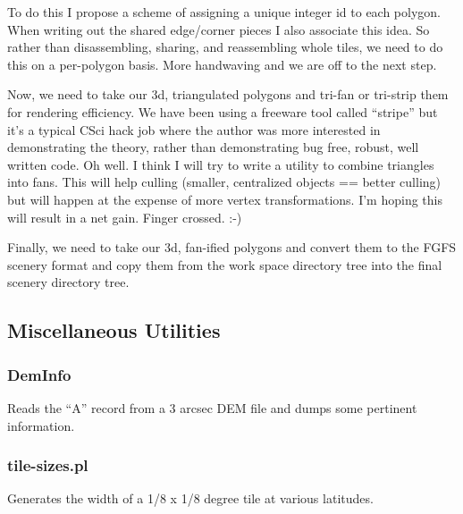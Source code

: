 \documentclass[12pt]{article}
\begin{document}
To do this I propose a scheme of assigning a unique integer id to each
polygon.  When writing out the shared edge/corner pieces I also
associate this idea.  So rather than disassembling, sharing, and
reassembling whole tiles, we need to do this on a per-polygon basis.
More handwaving and we are off to the next step.

Now, we need to take our 3d, triangulated polygons and tri-fan or
tri-strip them for rendering efficiency.  We have been using a
freeware tool called ``stripe'' but it's a typical CSci hack job where
the author was more interested in demonstrating the theory, rather
than demonstrating bug free, robust, well written code.  Oh well.  I
think I will try to write a utility to combine triangles into fans.
This will help culling (smaller, centralized objects == better
culling) but will happen at the expense of more vertex
transformations.  I'm hoping this will result in a net gain.  Finger
crossed. :-)

Finally, we need to take our 3d, fan-ified polygons and convert them
to the FGFS scenery format and copy them from the work space directory
tree into the final scenery directory tree.


\subsection{Miscellaneous Utilities}

\subsubsection{DemInfo}

Reads the ``A'' record from a 3 arcsec DEM file and dumps some
pertinent information.

\subsubsection{tile-sizes.pl}

Generates the width of a 1/8 x 1/8 degree tile at various latitudes.
\end{document}
